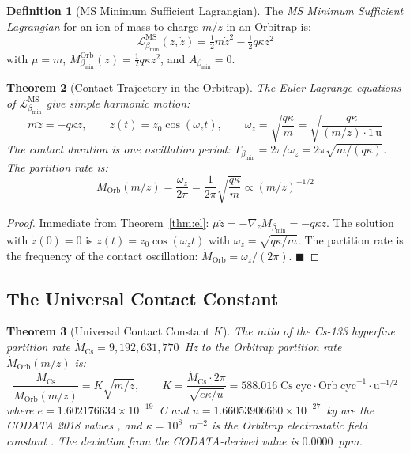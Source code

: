 \documentclass[12pt, a4paper]{article}
\theoremstyle{plain}
\newtheorem{theorem}{Theorem}[section]
\theoremstyle{definition}
\newtheorem{definition}[theorem]{Definition}
\theoremstyle{remark}
\newcommand{\bmin}{\beta_{\min}}
\newcommand{\Lmin}{\mathcal{L}_{\bmin}}
\newcommand{\half}{\tfrac{1}{2}}
\newcommand{\qed}{\hfill$\blacksquare$}
\begin{document}
\begin{definition}[MS Minimum Sufficient Lagrangian]
\label{def:ms_msl}
The \emph{MS Minimum Sufficient Lagrangian} for an ion of mass-to-charge $m/z$
in an Orbitrap is:
\[
  \Lmin^{\mathrm{MS}}(z, \dot{z}) = \half m\dot{z}^2 - \half q\kappa z^2
\]
with $\mu = m$, $M_{\bmin}^{\mathrm{Orb}}(z) = \half q\kappa z^2$, and
$A_{\bmin} = 0$.
\end{definition}

\begin{theorem}[Contact Trajectory in the Orbitrap]
\label{thm:orb_trajectory}
The Euler-Lagrange equations of $\Lmin^{\mathrm{MS}}$ give simple harmonic
motion:
\[
  m\ddot{z} = -q\kappa z, \qquad z(t) = z_0\cos(\omega_z t),\qquad
  \omega_z = \sqrt{\frac{q\kappa}{m}} = \sqrt{\frac{q\kappa}{(m/z)\cdot 1\,\mathrm{u}}}
\]
The contact duration is one oscillation period: $T_{\bmin} = 2\pi/\omega_z =
2\pi\sqrt{m/(q\kappa)}$. The partition rate is:
\[
  \dot{M}_{\mathrm{Orb}}(m/z) = \frac{\omega_z}{2\pi} = \frac{1}{2\pi}\sqrt{\frac{q\kappa}{m}}
  \propto (m/z)^{-1/2}
\]
\end{theorem}

\begin{proof}
Immediate from Theorem~\ref{thm:el}: $\mu\ddot{z} = -\nabla_z M_{\bmin} = -q\kappa z$.
The solution with $\dot{z}(0) = 0$ is $z(t) = z_0\cos(\omega_z t)$ with
$\omega_z = \sqrt{q\kappa/m}$. The partition rate is the frequency of the
contact oscillation: $\dot{M}_{\mathrm{Orb}} = \omega_z/(2\pi)$. \qed
\end{proof}

\subsection{The Universal Contact Constant}

\begin{theorem}[Universal Contact Constant $K$]
\label{thm:K}
The ratio of the Cs-133 hyperfine partition rate $\dot{M}_{\mathrm{Cs}} =
9{,}192{,}631{,}770$~Hz to the Orbitrap partition rate $\dot{M}_{\mathrm{Orb}}(m/z)$
is:
\[
  \frac{\dot{M}_{\mathrm{Cs}}}{\dot{M}_{\mathrm{Orb}}(m/z)}
  = K\sqrt{m/z},\qquad
  K = \frac{\dot{M}_{\mathrm{Cs}} \cdot 2\pi}{\sqrt{e\kappa/u}}
  = 588.016\;\mathrm{Cs\;cyc \cdot Orb\;cyc}^{-1}\cdot\mathrm{u}^{-1/2}
\]
where $e = 1.602176634\times10^{-19}$~C and $u = 1.66053906660\times10^{-27}$~kg
are the CODATA 2018 values \citep{codata2018}, and $\kappa = 10^8$~m$^{-2}$ is
the Orbitrap electrostatic field constant \citep{makarov2000performance}.
The deviation from the CODATA-derived value is $0.0000$~ppm.
\end{theorem}
\end{document}
